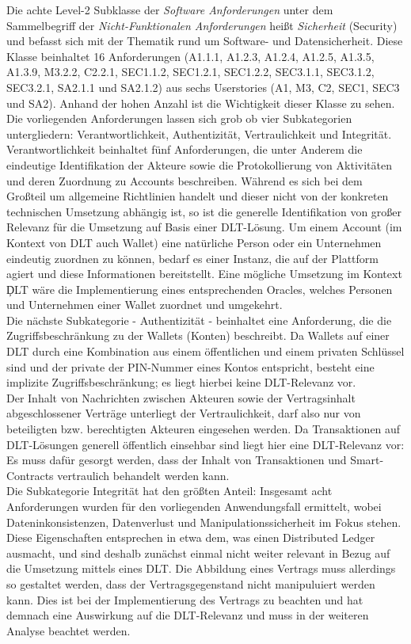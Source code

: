 Die achte Level-2 Subklasse der \textit{Software Anforderungen} unter dem Sammelbegriff der \textit{Nicht-Funktionalen Anforderungen} heißt \textit{Sicherheit} (Security) und befasst sich mit der Thematik rund um Software- und Datensicherheit. Diese Klasse beinhaltet 16 Anforderungen (A1.1.1, A1.2.3, A1.2.4, A1.2.5, A1.3.5, A1.3.9, M3.2.2, C2.2.1, SEC1.1.2, SEC1.2.1, SEC1.2.2, SEC3.1.1, SEC3.1.2, SEC3.2.1, SA2.1.1 und SA2.1.2) aus sechs Userstories (A1, M3, C2, SEC1, SEC3 und SA2). Anhand der hohen Anzahl ist die Wichtigkeit dieser Klasse zu sehen. Die vorliegenden Anforderungen lassen sich grob ob vier Subkategorien untergliedern: Verantwortlichkeit, Authentizität, Vertraulichkeit und Integrität. Verantwortlichkeit beinhaltet fünf Anforderungen, die unter Anderem die eindeutige Identifikation der Akteure sowie die Protokollierung von Aktivitäten und deren Zuordnung zu Accounts beschreiben. Während es sich bei dem Großteil um allgemeine Richtlinien handelt und dieser nicht von der konkreten technischen Umsetzung abhängig ist, so ist die generelle Identifikation von großer Relevanz für die Umsetzung auf Basis einer \ac{DLT}-Lösung. Um einem Account (im Kontext von \ac{DLT} auch Wallet) eine natürliche Person oder ein Unternehmen eindeutig zuordnen zu können, bedarf es einer Instanz, die auf der Plattform agiert und diese Informationen bereitstellt. Eine mögliche Umsetzung im Kontext \c{DLT} wäre die Implementierung eines entsprechenden Oracles, welches Personen und Unternehmen einer Wallet zuordnet und umgekehrt.\\
Die nächste Subkategorie - Authentizität - beinhaltet eine Anforderung, die die Zugriffsbeschränkung zu der Wallets (Konten) beschreibt. Da Wallets auf einer \ac{DLT} durch eine Kombination aus einem öffentlichen und einem privaten Schlüssel sind und der private der PIN-Nummer eines Kontos entspricht, besteht eine implizite Zugriffsbeschränkung; es liegt hierbei keine \ac{DLT}-Relevanz vor.\\
Der Inhalt von Nachrichten zwischen Akteuren sowie der Vertragsinhalt abgeschlossener Verträge unterliegt der Vertraulichkeit, darf also nur von beteiligten bzw. berechtigten Akteuren eingesehen werden. Da Transaktionen auf \ac{DLT}-Lösungen generell öffentlich einsehbar sind liegt hier eine \ac{DLT}-Relevanz vor: Es muss dafür gesorgt werden, dass der Inhalt von Transaktionen und Smart-Contracts vertraulich behandelt werden kann.\\
Die Subkategorie Integrität hat den größten Anteil: Insgesamt acht Anforderungen wurden für den vorliegenden Anwendungsfall ermittelt, wobei Dateninkonsistenzen, Datenverlust und Manipulationssicherheit im Fokus stehen. Diese Eigenschaften entsprechen in etwa dem, was einen Distributed Ledger ausmacht, und sind deshalb zunächst einmal nicht weiter relevant in Bezug auf die Umsetzung mittels eines \ac{DLT}. Die Abbildung eines Vertrags muss allerdings so gestaltet werden, dass der Vertragsgegenstand nicht manipuluiert werden kann. Dies ist bei der Implementierung des Vertrags zu beachten und hat demnach eine Auswirkung auf die \ac{DLT}-Relevanz und muss in der weiteren Analyse beachtet werden.



